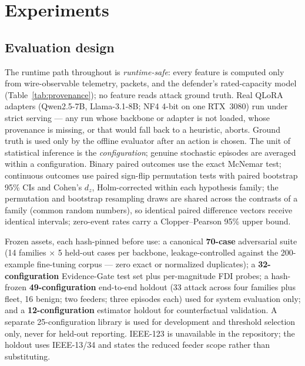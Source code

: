 \section{Experiments}
\label{sec:eval}

\subsection{Evaluation design}
\label{sec:exp-design}
The runtime path throughout is \emph{runtime-safe}: every feature is computed
only from wire-observable telemetry, packets, and the defender's rated-capacity
model (Table~\ref{tab:provenance}); no feature reads attack ground truth. Real
QLoRA adapters (Qwen2.5-7B, Llama-3.1-8B; NF4 4-bit on one RTX~3080) run under
strict serving --- any run whose backbone or adapter is not loaded, whose
provenance is missing, or that would fall back to a heuristic, aborts. Ground
truth is used only by the offline evaluator after an action is chosen. The
unit of statistical inference is the \emph{configuration}; genuine stochastic
episodes are averaged within a configuration. Binary paired outcomes use the
exact McNemar test; continuous outcomes use paired sign-flip permutation tests
with paired bootstrap 95\% CIs and Cohen's $d_z$, Holm-corrected within each
hypothesis family; the permutation and bootstrap resampling draws are shared
across the contrasts of a family (common random numbers), so identical paired
difference vectors receive identical intervals; zero-event rates carry a
Clopper--Pearson 95\% upper bound.

Frozen assets, each hash-pinned before use: a canonical \textbf{70-case}
adversarial suite (14 families $\times$ 5 held-out cases per backbone,
leakage-controlled against the 200-example fine-tuning corpus --- zero exact or
normalized duplicates); a \textbf{32-configuration} Evidence-Gate test set plus
per-magnitude FDI probes; a hash-frozen \textbf{49-configuration} end-to-end holdout (33 attack across four families
plus fleet, 16 benign; two feeders; three episodes each) used for
system evaluation only; and a \textbf{12-configuration} estimator holdout for
counterfactual validation. A separate 25-configuration library is used for
development and threshold selection only, never for held-out reporting.
IEEE-123 is unavailable in the repository; the
holdout uses IEEE-13/34 and states the reduced feeder scope rather than
substituting.

